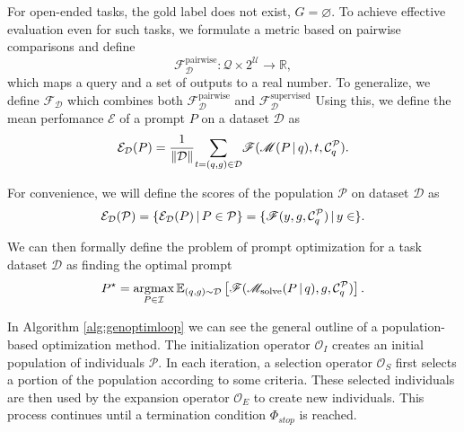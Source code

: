 For open-ended tasks, the gold label does not exist, $G = \varnothing$. To achieve effective evaluation even for such tasks, 
we formulate a metric based on pairwise comparisons and define
\begin{equation}
    \mathscr{F}_{\mathcal{D}}^{\text{pairwise}}: \mathcal{Q} \times 2^\mathcal{U} \rightarrow \mathbb{R},
\end{equation}
which maps a query and a set of outputs to a real number. 
To generalize, we define $\mathscr{F}_{\mathcal{D}}$ which combines both $\mathscr{F}_{\mathcal{D}}^{\text{pairwise}}$ and $\mathscr{F}_{\mathcal{D}}^{\text{supervised}}$
Using this, we define the mean perfomance $\mathcal{E}$ of a prompt $P$ on a dataset $\mathcal{D}$ as
\begin{equation}
    \mathcal{E}_{\mathcal{D}}(P) = \frac{1}{\Vert \mathcal{D} \Vert}\underset{t=(q,g)\in \mathcal{D}}{\sum}\mathscr{F}(\mathscr{M}(P\, \vert \, q), t, \mathcal{C}_{q}^{\mathcal{P}}).
\end{equation}

For convenience, we will define the scores of the population $\mathcal{P}$ on dataset $\mathcal{D}$ as
\begin{equation}
    \mathcal{E}_{\mathcal{D}}(\mathcal{P}) = \{\mathcal{E}_{\mathcal{D}}(P)\, \vert \, P\in \mathcal{P}\} = \{\mathscr{F}(y, g, \mathcal{C}_{q}^{\mathcal{P}})\, \vert \, y \in \}.
\end{equation}

We can then formally define the problem of prompt optimization for a task dataset $\mathcal{D}$ as finding the optimal prompt 
\begin{equation}
    \label{eq:optimdef}
    P^{\star} = \underset{P\in\mathcal{I}}{\operatorname{argmax}}\,\mathbb{E}_{(q, g) \sim \mathcal{D}}\left[\mathscr{F}(\mathscr{M}_{\text{solve}}(P \, \vert \, q), g, \mathcal{C}_{q}^{\mathcal{P}})\right].
\end{equation}

In Algorithm \ref{alg:genoptimloop} we can see the general outline of a population-based optimization method.
The initialization operator $\mathscr{O}_I$ creates an initial population of individuals $\mathcal{P}$. 
In each iteration, a selection operator $\mathscr{O}_S$ first selects a portion of the population according to some criteria. 
These selected individuals are then used by the expansion operator $\mathscr{O}_E$ to create new individuals.
This process continues until a termination condition $\Phi_{stop}$ is reached.

